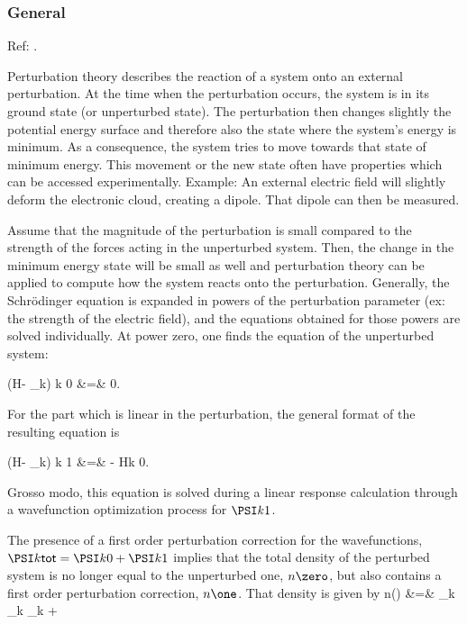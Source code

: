 \documentclass[twoside,10pt,titlepage,a4paper]{article}
\begin{document}
\newcommand{\dr}{d^3r}


\subsubsection{General}

Ref: \cite{apdsmp}.

Perturbation theory describes the reaction of a system onto an
external perturbation. At the time when the perturbation occurs, the
system is in its ground state (or unperturbed state). The perturbation
then changes slightly the potential energy surface and therefore also
the state where the system's energy is minimum. As a consequence, the
system tries to move towards that state of minimum energy. This
movement or the new state often have properties which can be accessed
experimentally. Example: An external electric field will slightly
deform the electronic cloud, creating a dipole. That dipole can then
be measured.


Assume that the magnitude of the perturbation is small compared to the
strength of the forces acting in the unperturbed system. Then, the
change in the minimum energy state will be small as well and
perturbation theory can be applied to compute how the system reacts
onto the perturbation. Generally, the Schr\"odinger equation is
expanded in powers of the perturbation parameter (ex: the strength of
the electric field), and the equations obtained for those powers are
solved individually. At power zero, one finds the equation of the
unperturbed system:

\beq
  (H\zero - \varepsilon_k) \PSI k 0 &=& 0.
\eeq

For the part which is linear in the perturbation,
the general format of the resulting equation is

\beq
  (H\zero - \varepsilon_k) \PSI k 1  &=& - H\one \PSI k 0.
\label{eqn:sternheimer}
\eeq

Grosso modo, this equation is solved during a linear response
calculation through a wavefunction optimization process for {$\PSI k
1$}.


The presence of a first order perturbation correction for the
wavefunctions, $\PSI k {\text{\sf tot}} = \PSI k 0 + \PSI k 1$ implies
that the total density of the perturbed system is no longer equal to
the unperturbed one, $n\zero$, but also contains a first order
perturbation correction, $n\one$.  That density is given by
\beq
n\one (\rv) &=& \sum_k
           \langle \varphi\one_k \vert \rv \rangle \;
           \langle \rv \vert \varphi\zero_k \rangle
           + 
\eeq
\end{document}
